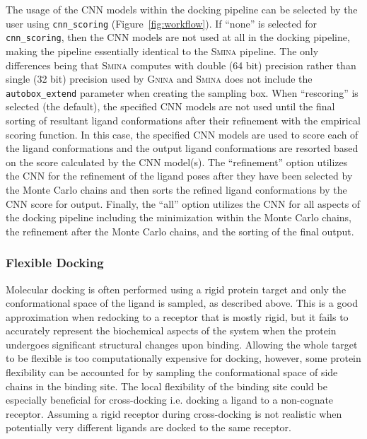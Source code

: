 \documentclass[journal=jcisd8,manuscript=article]{achemso}
\begin{document}
The usage of the CNN models within the docking pipeline can be selected by the user using \texttt{cnn\_scoring} (Figure~\ref{fig:workflow}). If ``none'' is selected for \texttt{cnn\_scoring}, then the CNN models are not used at all in the docking pipeline, making the pipeline essentially identical to the \textsc{Smina} pipeline. The only differences being that \textsc{Smina} computes with double (64 bit) precision rather than single (32 bit) precision used by \textsc{Gnina} and \textsc{Smina} does not include the \texttt{autobox\_extend} parameter when creating the sampling box. When ``rescoring'' is selected (the default), the specified CNN models are not used until the final sorting of resultant ligand conformations after their refinement with the empirical scoring function. In this case, the specified CNN models are used to score each of the ligand conformations and the output ligand conformations are resorted based on the score calculated by the CNN model(s). The ``refinement'' option utilizes the CNN for the refinement of the ligand poses after they have been selected by the Monte Carlo chains and then sorts the refined ligand conformations by the CNN score for output. Finally, the ``all'' option utilizes the CNN for all aspects of the docking pipeline including the minimization within the Monte Carlo chains, the refinement after the Monte Carlo chains, and the sorting of the final output. 

\subsubsection{Flexible Docking}

Molecular docking is often performed using a rigid protein target and only the conformational space of the ligand is sampled, as described above. This is a good approximation when redocking to a receptor that is mostly rigid, but it fails to accurately represent the biochemical aspects of the system when the protein undergoes significant structural changes upon binding\cite{Teague2003}. Allowing the whole target to be flexible is too computationally expensive for docking, however, some protein flexibility can be accounted for by sampling the conformational space of side chains in the binding site\cite{Zhao2008}. The local flexibility of the binding site could be especially beneficial for cross-docking i.e. docking a ligand to a non-cognate receptor. Assuming a rigid receptor during cross-docking is not realistic when potentially very different ligands are docked to the same receptor.
\end{document}
